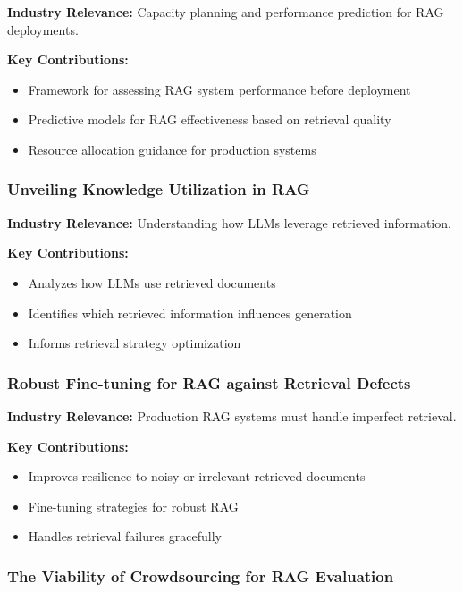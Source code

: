 \documentclass[11pt,letterpaper]{article}
\begin{document}
\textbf{Industry Relevance:} Capacity planning and performance prediction for RAG deployments.

\textbf{Key Contributions:}
\begin{itemize}[leftmargin=*]
    \item Framework for assessing RAG system performance before deployment
    \item Predictive models for RAG effectiveness based on retrieval quality
    \item Resource allocation guidance for production systems
\end{itemize}

\subsubsection{Unveiling Knowledge Utilization in RAG}

\textbf{Industry Relevance:} Understanding how LLMs leverage retrieved information.

\textbf{Key Contributions:}
\begin{itemize}[leftmargin=*]
    \item Analyzes how LLMs use retrieved documents
    \item Identifies which retrieved information influences generation
    \item Informs retrieval strategy optimization
\end{itemize}

\subsubsection{Robust Fine-tuning for RAG against Retrieval Defects}

\textbf{Industry Relevance:} Production RAG systems must handle imperfect retrieval.

\textbf{Key Contributions:}
\begin{itemize}[leftmargin=*]
    \item Improves resilience to noisy or irrelevant retrieved documents
    \item Fine-tuning strategies for robust RAG
    \item Handles retrieval failures gracefully
\end{itemize}

\subsubsection{The Viability of Crowdsourcing for RAG Evaluation}
\end{document}
